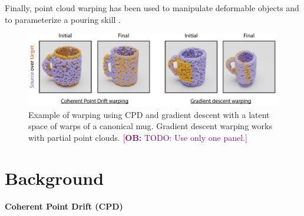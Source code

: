 \documentclass{article}
\newcommand{\ob}[1]{\textcolor{purple}{[\textbf{OB:} #1]}}
\begin{document}
Finally, point cloud warping has been used to manipulate deformable objects \cite{lee15learning,schulman16learning} and to parameterize a pouring skill \cite{brandi14generalizing}.




\begin{figure}
    \centering
    \includegraphics[width=\textwidth]{figures/warping.pdf}
    \caption{Example of warping using CPD and gradient descent with a latent space of warps of a canonical mug. Gradient descent warping works with partial point clouds. \ob{TODO: Use only one panel.}}
    \label{fig:warping}
\end{figure}


\section{Background}
\label{sec:background}

\paragraph{Coherent Point Drift (CPD)}
\end{document}
